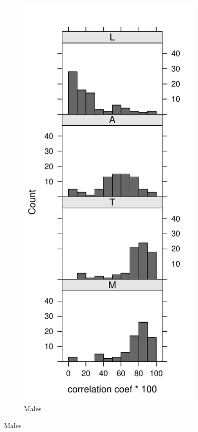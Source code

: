\documentclass[11pt,oneside]{article} %
\begin{document}
\begin{figure}
\begin{subfigure}{.5\linewidth}
 \end{subfigure}~
 \begin{subfigure}{.5\linewidth}
 \caption{Males}
 \vspace{-2em}
 \includegraphics[scale=.8]{Figures/HistMal.pdf}
 \end{subfigure}
\end{figure}
\end{document}
